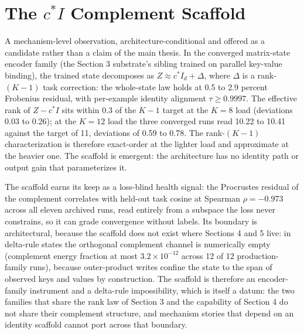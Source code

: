 \renewcommand{\thefigure}{A\arabic{figure}}
\renewcommand{\theHfigure}{A\arabic{figure}}
\setcounter{figure}{0}
\section{The $c^{*} I$ Complement Scaffold}

A mechanism-level observation, architecture-conditional and offered as
a candidate rather than a claim of the main thesis. In the converged
matrix-state encoder family (the Section 3 substrate's sibling trained
on parallel key-value binding), the trained state decomposes as
$Z \approx c^{*} I_d + \Delta$, where $\Delta$ is a rank-$(K{-}1)$ task
correction: the whole-state law holds at 0.5 to 2.9 percent Frobenius
residual, with per-example identity alignment $\tau \ge 0.9997$. The effective rank of $Z - c^{*} I$ sits within
0.3 of the $K{-}1$ target at the $K{=}8$ load (deviations 0.03 to
0.26); at the $K{=}12$ load the three converged runs read 10.22 to
10.41 against the target of 11, deviations of 0.59 to 0.78. The rank-$(K{-}1)$ characterization is therefore
exact-order at the lighter load and approximate at the heavier one. The
scaffold is emergent: the architecture has no identity path or output
gain that parameterizes it.

The scaffold earns its keep as a loss-blind health signal: the
Procrustes residual of the complement correlates with held-out task
cosine at Spearman $\rho = -0.973$ across all eleven archived runs, read entirely from a subspace the loss never
constrains, so it can grade convergence without labels. Its boundary
is architectural, because the scaffold does not exist where Sections 4
and 5 live: in delta-rule states the orthogonal
complement channel is numerically empty (complement energy fraction at
most $3.2 \times 10^{-12}$ across 12 of 12 production-family runs), because outer-product writes confine the state
to the span of observed keys and values by construction. The scaffold
is therefore an encoder-family instrument and a delta-rule
impossibility, which is itself a datum: the two families that share the
rank law of Section 3 and the capability of Section 4 do not share
their complement structure, and mechanism stories that depend on an
identity scaffold cannot port across that boundary.

